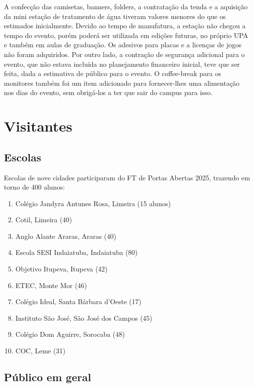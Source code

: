 \documentclass[
  letterpaper,
  DIV=11,
  numbers=noendperiod]{scrreprt}
\begin{document}
A confecção das camisetas, banners, folders, a contratação da tenda e a
aquisição da mini estação de tratamento de água tiveram valores menores
do que os estimados inicialmente. Devido ao tempo de manufatura, a
estação não chegou a tempo do evento, porém poderá ser utilizada em
edições futuras, no próprio UPA e também em aulas de graduação. Os
adesivos para placas e a licenças de jogos não foram adquiridos. Por
outro lado, a contração de segurança adicional para o evento, que não
estava incluída no planejamento financeiro inicial, teve que ser feita,
dada a estimativa de público para o evento. O coffee-break para os
monitores também foi um item adicionado para fornecer-lhes uma
alimentação nos dias do evento, sem obrigá-los a ter que sair do campus
para isso.

\chapter{Visitantes}\label{visitantes}

\section{Escolas}\label{escolas-1}

Escolas de nove cidades participaram do FT de Portas Abertas 2025,
trazendo em torno de 400 alunos:

\begin{enumerate}
\def\labelenumi{\arabic{enumi}.}
\item
  Colégio Jandyra Antunes Rosa, Limeira (15 alunos)
\item
  Cotil, Limeira (40)
\item
  Anglo Alante Araras, Araras (40)
\item
  Escola SESI Indaiatuba, Indaiatuba (80)
\item
  Objetivo Itupeva, Itupeva (42)
\item
  ETEC, Monte Mor (46)
\item
  Colégio Ideal, Santa Bárbara d'Oeste (17)
\item
  Instituto São José, São José dos Campos (45)
\item
  Colégio Dom Aguirre, Sorocaba (48)
\item
  COC, Leme (31)
\end{enumerate}

\section{Público em geral}\label{puxfablico-em-geral}
\end{document}
